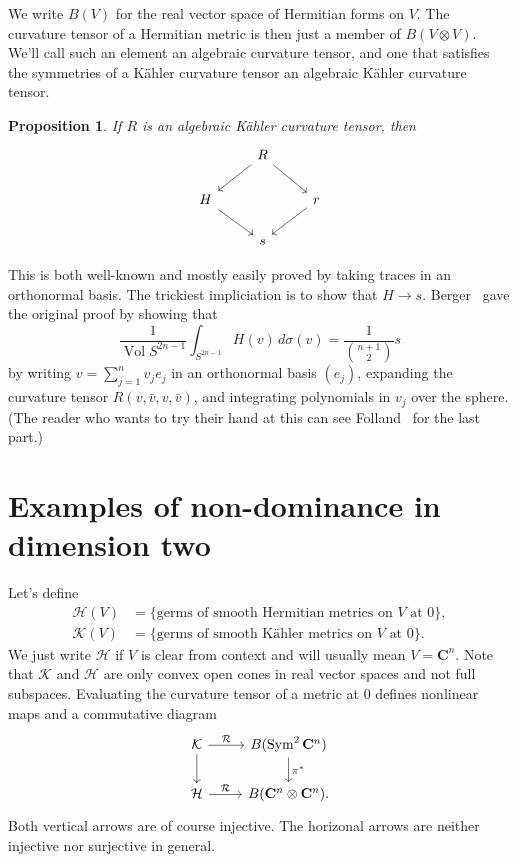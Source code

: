 \documentclass[10pt,a4paper]{amsart}
\newtheorem{prop}[theo]{Proposition}
\theoremstyle{definition}
\newcommand{\kk}[1]{\mathbf{#1}}
\newcommand{\cc}[1]{\mathcal{#1}}
\DeclareMathOperator{\Vol}{Vol}
\begin{document}
We write $B(V)$ for the real vector space of Hermitian forms on $V$.
The curvature tensor of a Hermitian metric is then just a member of $B(V
\otimes V)$.
We'll call such an element an algebraic curvature tensor, and one that
satisfies the symmetries of a K\"ahler curvature tensor an algebraic
K\"ahler curvature tensor.


\begin{prop}
\label{prop:dominance}
If $R$ is an algebraic K\"ahler curvature tensor, then
$$
\begin{tikzcd}
& R \ar[dl] \ar[dr] &
\\
H \ar[dr] & & r \ar[dl]
\\
& s &
\end{tikzcd}
$$
\end{prop}

This is both well-known and mostly easily proved by taking traces in an
orthonormal basis.
The trickiest impliciation is to show that $H \to s$.
Berger~\cite{berger1965varietes} gave the original proof by showing that
$$
\frac{1}{\Vol S^{2n-1}} \int_{S^{2n-1}} \!\!\! H(v) \, d\sigma(v)
= \frac{1}{\binom{n+1}{2}} s
$$
by writing $v = \sum_{j=1}^n v_j e_j$ in an orthonormal basis $(e_j)$,
expanding the curvature tensor $R(v, \bar v, v, \bar v)$, and integrating
polynomials in $v_j$ over the sphere. (The reader who wants to try their
hand at this can see Folland~\cite{folland} for the last part.)


\section{Examples of non-dominance in dimension two}

Let's define
\begin{align*}
\cc H(V)
&= \{ \text{germs of smooth Hermitian metrics on $V$ at $0$} \},
\\
\cc K(V)
&= \{ \text{germs of smooth K\"ahler metrics on $V$ at $0$} \}.
\end{align*}
We just write $\cc H$ if $V$ is clear from context and will usually mean $V =
\kk C^n$. Note that $\cc K$ and $\cc H$ are only convex open cones in real
vector spaces and not full subspaces.
Evaluating the curvature tensor of a metric at $0$ defines nonlinear maps and a
commutative diagram
$$
\begin{tikzcd}
\cc K \ar[d] \ar[r,"\cc R"] & B(\operatorname{Sym}^2 \kk C^n)\ar[d,"\pi^*"]
\\
\cc H \ar[r, "\cc R"] & B(\kk C^n \otimes \kk C^n).
\end{tikzcd}
$$
Both vertical arrows are of course injective.
The horizonal arrows are neither injective nor surjective in general.
\end{document}

